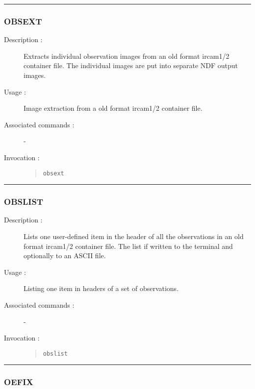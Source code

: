 \hrule 
\subsubsection*{\label{OBSEXT}OBSEXT}

\begin{description}

\item[Description :] Extracts individual observation images from an old
format {\sc ircam1/2} container file.  The individual images are put
into separate NDF output images.

\item[Usage :] Image extraction from a old format {\sc ircam1/2}
container file.

\item[Associated commands :] -
\item[Invocation :]

\begin{quote}{\tt  obsext }\end{quote}

\end{description}

\hrule 
\subsubsection*{\label{OBSLIST}OBSLIST}

\begin{description}

\item[Description :] Lists one user-defined item in the header of all
the observations in an old format {\sc ircam1/2} container file.  The
list if written to the terminal and optionally to an ASCII file.

\item[Usage :] Listing one item in headers of a set of observations.
\item[Associated commands :] -
\item[Invocation :]

\begin{quote}{\tt  obslist }\end{quote}

\end{description}

\hrule 
\subsubsection*{\label{OEFIX}OEFIX}

